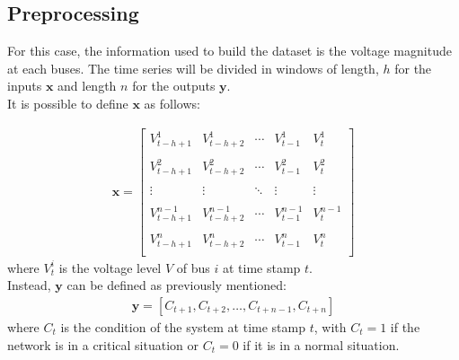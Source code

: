 \subsection{Preprocessing}
For this case, the information used to build the dataset is the voltage magnitude at each buses. The time series will be divided in windows of length, $h$ for the inputs $\textbf{x}$ and length $n$ for the outputs $\textbf{y}$. \\

It is possible to define $\textbf{x}$ as follows:

\begin{equation}
  \begin{aligned}
    \textbf{x}  = 
        \begin{bmatrix}
        V^1_{t-h+1} & V^1_{t-h+2} & \cdots & V^1_{t-1} & V^1_{t} \\
        & & & & \\
        
        V^2_{t-h+1} & V^2_{t-h+2} & \cdots & V^2_{t-1} & V^2_{t} \\
        & & & & \\
        
        \vdots & \vdots & \ddots & \vdots & \vdots \\
        & & & & \\
        
        V^{n-1}_{t-h+1} & V^{n-1}_{t-h+2} & \cdots & V^{n-1}_{t-1} & V^{n-1}_{t} \\
        & & & & \\
        
        V^n_{t-h+1} & V^n_{t-h+2} & \cdots & V^n_{t-1} & V^n_{t} \\
        \end{bmatrix}
  \end{aligned}
\end{equation}
\noindent where $V^i_t$ is the voltage level $V$ of bus $i$ at time stamp $t$. \\

\noindent Instead, $\textbf{y}$ can be defined as previously mentioned: 
\begin{equation}
    \begin{aligned}
        \textbf{y} = [C_{t+1},C_{t+2}, \dots, C_{t+n-1},C_{t+n}]
    \end{aligned}
\end{equation}
\noindent where $C_t$ is the condition of the system at time stamp $t$, with $C_t=1$ if the network is in a critical situation or $C_t=0$ if it is in a normal situation. \\

